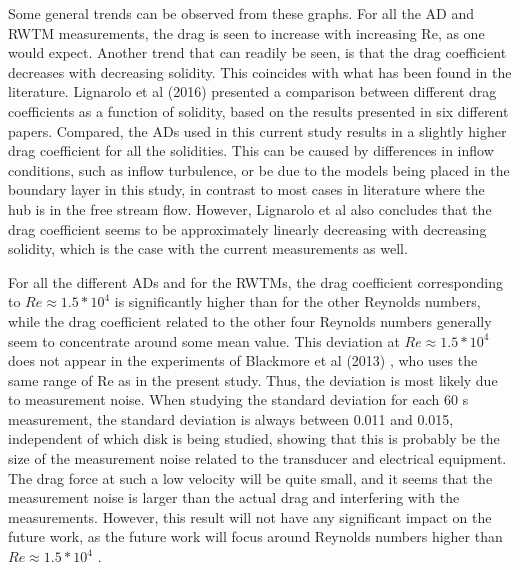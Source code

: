 Some general trends can be observed from these graphs. For all the \gls{AD} and \gls{RWTM} measurements, the drag is seen to increase with increasing Re, as one would expect. Another trend that can readily be seen, is that the drag coefficient decreases with decreasing solidity. This coincides with what has been found in the literature. Lignarolo et al (2016) \cite{Lignarolo2016} presented a comparison between different drag coefficients as a function of solidity, based on the results presented in six different papers. Compared, the \gls{AD}s used in this current study results in a slightly higher drag coefficient for all the solidities. This can be caused by differences in inflow conditions, such as inflow turbulence, or be due to the models being placed in the boundary layer in this study, in contrast to most cases in literature where the hub is in the free stream flow. However, Lignarolo et al also concludes that the drag coefficient seems to be approximately linearly decreasing with decreasing solidity, which is the case with the current measurements as well. 

For all the different \gls{AD}s and for the \gls{RWTM}s, the drag coefficient corresponding to $Re \approx 1.5*10^4$ is significantly higher than for the other Reynolds numbers, while the drag coefficient related to the other four Reynolds numbers generally seem to concentrate around some mean value. This deviation at $Re \approx 1.5*10^4$ does not appear in the experiments of Blackmore et al (2013) \cite{Blackmore2013}, who uses the same range of Re as in the present study. Thus, the deviation is most likely due to measurement noise. When studying the standard deviation for each 60 \si{\s} measurement, the standard deviation is always between 0.011 and 0.015, independent of which disk is being studied, showing that this is probably be the size of the measurement noise related to the transducer and electrical equipment. The drag force at such a low velocity will be quite small, and it seems that the measurement noise is larger than the actual drag and interfering with the measurements. However, this result will not have any significant impact on the future work, as the future work will focus around Reynolds numbers higher than $Re \approx 1.5*10^4$ . 



